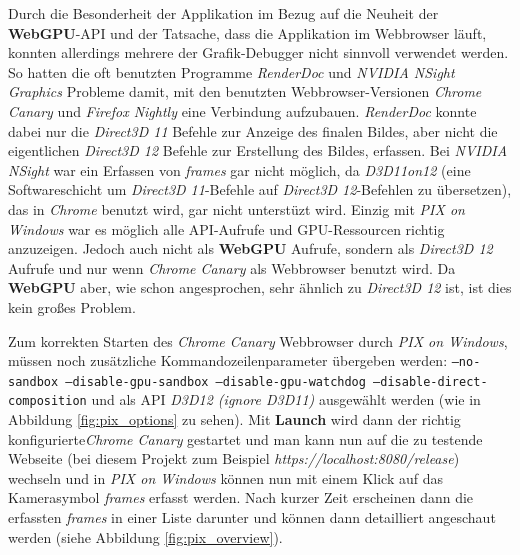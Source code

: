 \documentclass[oneside]{ausarbeitung}
\begin{document}
Durch die Besonderheit der Applikation im Bezug auf die Neuheit der \textbf{WebGPU}-\ac{API} und der Tatsache, dass die Applikation im Webbrowser läuft, konnten allerdings mehrere der Grafik-Debugger nicht sinnvoll verwendet werden. So hatten die oft benutzten Programme \textit{RenderDoc} \cite{renderdoc} und \textit{NVIDIA NSight Graphics} \cite{nvidia:nsight_graphics} Probleme damit, mit den benutzten Webbrowser-Versionen \textit{Chrome Canary}  \cite{google:chrome_canary} und \textit{Firefox Nightly} \cite{mozilla:firefox_nightly} eine Verbindung aufzubauen. \textit{RenderDoc} konnte dabei nur die \textit{Direct3D 11} Befehle zur Anzeige des finalen Bildes, aber nicht die eigentlichen \textit{Direct3D 12} Befehle zur Erstellung des Bildes, erfassen. Bei \textit{NVIDIA NSight} war ein Erfassen von \textit{frames} gar nicht möglich, da \textit{D3D11on12} \cite{microsoft:d3d11on12} (eine Softwareschicht um \textit{Direct3D 11}-Befehle auf \textit{Direct3D 12}-Befehlen zu übersetzen), das in \textit{Chrome} benutzt wird, gar nicht unterstüzt wird. Einzig mit \textit{PIX on Windows} \cite{microsoft:pix} war es möglich alle \ac{API}-Aufrufe und \ac{GPU}-Ressourcen  richtig anzuzeigen. Jedoch auch nicht als \textbf{WebGPU} Aufrufe, sondern als \textit{Direct3D 12} Aufrufe und nur wenn \textit{Chrome Canary} als Webbrowser benutzt wird. Da \textbf{WebGPU} aber, wie schon angesprochen, sehr ähnlich zu \textit{Direct3D 12} ist, ist dies kein großes Problem.

Zum korrekten Starten des \textit{Chrome Canary} Webbrowser durch \textit{PIX on Windows}, müssen noch zusätzliche Kommandozeilenparameter übergeben werden: 
\texttt{--no-sandbox --disable-gpu-sandbox --disable-gpu-watchdog --disable-direct-composition} 
und als API \textit{D3D12 (ignore D3D11)} ausgewählt werden (wie in Abbildung \ref{fig:pix_options} zu sehen). Mit \textbf{Launch} wird dann der richtig konfigurierte\textit{Chrome Canary} gestartet und man kann nun auf die zu testende Webseite (bei diesem Projekt zum Beispiel \textit{https://localhost:8080/release}) wechseln und in \textit{PIX on Windows} können nun mit einem Klick auf das Kamerasymbol \textit{frames} erfasst werden. Nach kurzer Zeit erscheinen dann die erfassten \textit{frames} in einer Liste darunter und können dann detailliert angeschaut werden (siehe Abbildung \ref{fig:pix_overview}).
\end{document}
